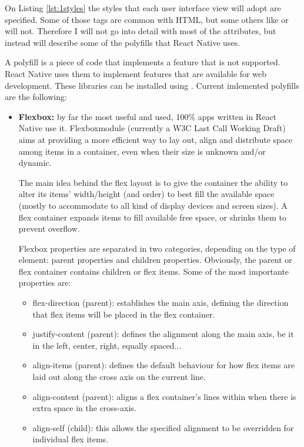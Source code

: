 On Listing \ref{lst:1styles} the styles that each user interface view will adopt are specified. Some of those tags are common with HTML, but some others like  or  will not. Therefore I will not go into detail with most of the attributes, but instead will describe some of the polyfills that React Native uses.

A polyfill is a piece of code that implements a feature that is not supported. React Native uses them to implement features that are available for web development. These libraries can be installed using . Current imlemented polyfills are the following:

\begin{itemize}
 \item \textbf{Flexbox:} by far the most useful and used, 100\% apps written in React Native use it. Flexboxmodule (currently a W3C Last Call Working Draft) aims at providing a more efficient way to lay out, align and distribute space among items in a container, even when their size is unknown and/or dynamic.~\cite{flexbox}

 The main idea behind the flex layout is to give the container the ability to alter its items' width/height (and order) to best fill the available space (mostly to accommodate to all kind of display devices and screen sizes). A flex container expands items to fill available free space, or shrinks them to prevent overflow.

 Flexbox properties are separated in two categories, depending on the type of element: parent properties and children properties. Obviously, the parent or flex container contains children or flex items. Some of the most importante properties are:

 \begin{itemize}
  \item flex-direction (parent): establishes the main axis, defining the direction that flex items will be placed in the flex container.
  \item justify-content (parent): defines the alignment along the main axis, be it in the left, center, right, equally spaced...
  \item align-items (parent): defines the default behaviour for how flex items are laid out along the cross axis on the current line.
  \item align-content (parent): aligns a flex container's lines within when there is extra space in the cross-axis.
  \item align-self (child): this allows the specified alignment to be overridden for individual flex items.
 \end{itemize}


\end{itemize}
